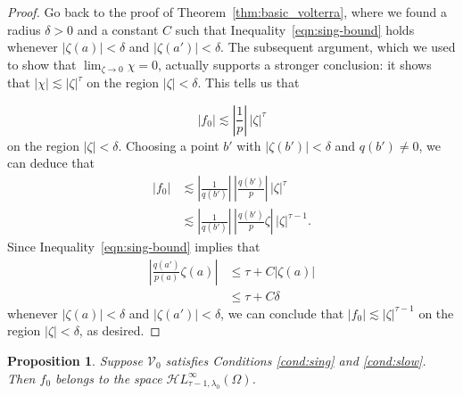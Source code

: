 \documentclass{article}
\theoremstyle{plain}
\newtheorem{prop}{Proposition}
\newcommand{\singexp}[2]{\mathcal{H}L^\infty_{#1, #2}}
\newcommand{\hardpart}{\mathcal{V}_0}
\newcommand{\solproto}{f_0}
\newcommand{\domain}{\Omega}
\begin{document}
\begin{proof}
Go back to the proof of Theorem~\ref{thm:basic_volterra}, where we found a radius $\delta > 0$ and a constant $C$ such that Inequality~\eqref{eqn:sing-bound} holds whenever $|\zeta(a)| < \delta$ and $|\zeta(a')| < \delta$. The subsequent argument, which we used to show that $\lim_{\zeta \to 0} \chi = 0$, actually supports a stronger conclusion: it shows that $|\chi| \lesssim |\zeta|^\tau$ on the region $|\zeta| < \delta$. This tells us that


\[ |\solproto| \lesssim \left|\frac{1}{p}\right|\,|\zeta|^\tau \]
on the region $|\zeta| < \delta$. Choosing a point $b'$ with $|\zeta(b')| < \delta$ and $q(b') \neq 0$, we can deduce that
\begin{align*}
|\solproto| & \lesssim \left|\frac{1}{q(b')}\right|\,\left|\frac{q(b')}{p}\right|\,|\zeta|^\tau \\
& \lesssim \left|\frac{1}{q(b')}\right|\,\left|\frac{q(b')}{p} \zeta\right|\,|\zeta|^{\tau-1}.
\end{align*}
Since Inequality~\ref{eqn:sing-bound} implies that
\begin{align*}
\left|\frac{q(a')}{p(a)}\zeta(a)\right| & \le \tau + C|\zeta(a)| \\
& \le \tau + C\delta
\end{align*}
whenever $|\zeta(a)| < \delta$ and $|\zeta(a')| < \delta$, we can conclude that $|\solproto| \lesssim |\zeta|^{\tau-1}$ on the region $|\zeta| < \delta$, as desired.
\end{proof}
\begin{prop}\label{prop:asymptotic at infinity}
Suppose $\hardpart$ satisfies {\em Conditions \eqref{cond:sing}} and \eqref{cond:slow}. Then $\solproto$ belongs to the space $\singexp{\tau-1}{\lambda_0}(\domain)$.
\end{prop}
\end{document}
